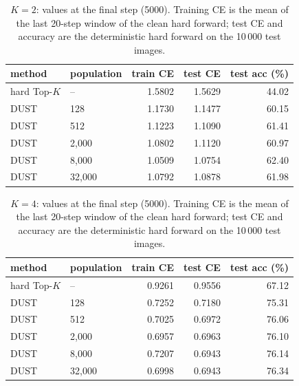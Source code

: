 \begin{table}[H]
\centering
\caption{$K = 2$: values at the final step (5000). Training CE is the mean of the last 20-step window of the clean hard forward; test CE and accuracy are the deterministic hard forward on the 10\,000 test images.}
\label{tab:k2}
\begin{tabular}{llrrr}
\toprule
    method & population & train CE & test CE & test acc (\%) \\
\midrule
    hard Top-$K$ & -- & 1.5802 & 1.5629 & 44.02 \\
    DUST & 128 & 1.1730 & 1.1477 & 60.15 \\
    DUST & 512 & 1.1223 & 1.1090 & 61.41 \\
    DUST & 2,000 & 1.0802 & 1.1120 & 60.97 \\
    DUST & 8,000 & 1.0509 & 1.0754 & 62.40 \\
    DUST & 32,000 & 1.0792 & 1.0878 & 61.98 \\
\bottomrule
\end{tabular}
\end{table}

\begin{table}[H]
\centering
\caption{$K = 4$: values at the final step (5000). Training CE is the mean of the last 20-step window of the clean hard forward; test CE and accuracy are the deterministic hard forward on the 10\,000 test images.}
\label{tab:k4}
\begin{tabular}{llrrr}
\toprule
    method & population & train CE & test CE & test acc (\%) \\
\midrule
    hard Top-$K$ & -- & 0.9261 & 0.9556 & 67.12 \\
    DUST & 128 & 0.7252 & 0.7180 & 75.31 \\
    DUST & 512 & 0.7025 & 0.6972 & 76.06 \\
    DUST & 2,000 & 0.6957 & 0.6963 & 76.10 \\
    DUST & 8,000 & 0.7207 & 0.6943 & 76.14 \\
    DUST & 32,000 & 0.6998 & 0.6943 & 76.34 \\
\bottomrule
\end{tabular}
\end{table}

